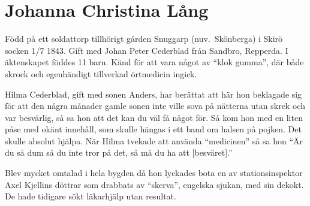 \chapter{Johanna Christina Lång}
\label{johanna_christina_lång}
Född på ett soldattorp tillhörigt gården Snuggarp (nuv.~Skönberga) i Skirö socken 1/7 1843. Gift med Johan Peter Cederblad från Sandbro, Repperda.
I äktenskapet föddes 11 barn. Känd för att vara något av ``klok gumma'', där både skrock och egenhändigt tillverkad örtmedicin ingick.

Hilma Cederblad, gift med sonen Anders, har berättat att här hon beklagade sig för att den några månader gamle sonen inte ville sova på nätterna utan skrek och var besvärlig, så sa hon att det kan du väl få något för. Så kom hon med en liten påse med okänt innehåll, som skulle hängas i ett band om halsen på pojken. Det skulle absolut hjälpa. När Hilma tvekade att använda ``medicinen'' så sa hon ``Är du så dum så du inte tror på det, så må du ha att [besväret].''

Blev mycket omtalad i hela bygden då hon lyckades bota en av stationsinspektor Axel Kjellins döttrar som drabbats av ``skerva'', engelska sjukan, med sin dekokt. De hade tidigare sökt läkarhjälp utan resultat.